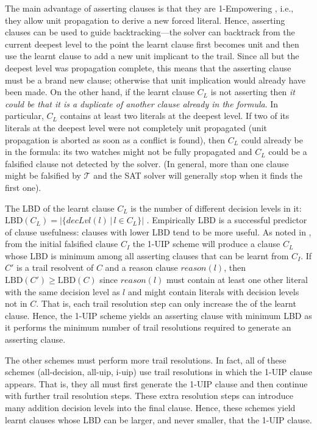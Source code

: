 \documentclass[runningheads]{llncs}
\newcommand{\sat}{SAT\xspace}
\newcommand{\LBD}{\text{LBD}\xspace}
\newcommand{\trail}{\ensuremath{\mathcal{T}}}
\newcommand{\dlevel}[1]{\ensuremath{\mathit{decLvl}(#1)}}
\newcommand{\reason}[1]{\ensuremath{\mathit{reason}(#1)}}
\newcommand{\nf}[1]{{\color{red}{#1}}}
\begin{document}
The main advantage of asserting clauses is that they are 1-Empowering
\cite{DBLP:journals/ai/PipatsrisawatD11}, i.e., they allow unit
propagation to derive a new forced literal. Hence, asserting clauses
can be used to guide backtracking---the solver can backtrack from the
current deepest level to the point the learnt clause first becomes
unit\nf{,} and then use the learnt clause to add a new unit implicant to the
trail. Since all but the deepest level was propagation complete, this
means that the asserting clause must be a brand new clause; otherwise
that unit implication would already have been made. On the other hand,
if the learnt clause $C_L$ is not asserting then \emph{it could be
  that it is a duplicate of another clause already in the formula}. In
particular, $C_L$ contains at least two literals at the deepest level.
If two of its literals at the deepest level were \nf{forced but} not completely
unit propagated (unit propagation is aborted as soon as a conflict is
found), then $C_L$ could already be in the formula: its two watches
might not be fully propagated and $C_L$ could be a falsified clause
not detected by the solver. (In general, more than one clause might be
falsified by $\trail$ and the \sat solver will generally stop when it
finds the first one).

The LBD of the learnt clause $C_L$ is the number of different decision
levels in it:
$\LBD(C_L)=\left|\big\{\dlevel{l}\,|\,l \in C_L\big\}\right|$
\cite{DBLP:conf/ijcai/AudemardS09}. Empirically LBD is a successful
predictor of clause usefulness: clauses with lower LBD tend to be more
useful. As noted in \cite{DBLP:conf/ijcai/AudemardS09}, from the
initial falsified clause $C_I$ the 1-UIP scheme will produce a clause
$C_L$ whose LBD is minimum among all asserting clauses that can be
learnt from $C_I$. If $C'$ is a trail resolvent of $C$ and a reason
clause $\reason{l}$, then $\LBD(C') \geq \LBD(C)$ since $\reason{l}$
must contain at least one other literal with the same decision level
as $l$ and might contain literals with decision levels not in
$C$. That is, each trail resolution step can only increase the \LBD of
the learnt clause. Hence, the 1-UIP scheme yields an asserting clause
with minimum LBD as it performs the minimum number of trail resolutions
required to generate an asserting clause.

The other schemes must perform more trail resolutions. In fact, all of
these schemes (all-decision, all-uip, i-uip) use trail resolutions in
which the 1-UIP clause appears. That is, they all must first generate
the 1-UIP clause and then continue with further trail resolution
steps. These extra resolution steps can introduce many addition
decision levels into the final clause. Hence, these schemes yield
learnt clauses whose LBD can be larger, and never smaller, that the
1-UIP clause.
\end{document}
